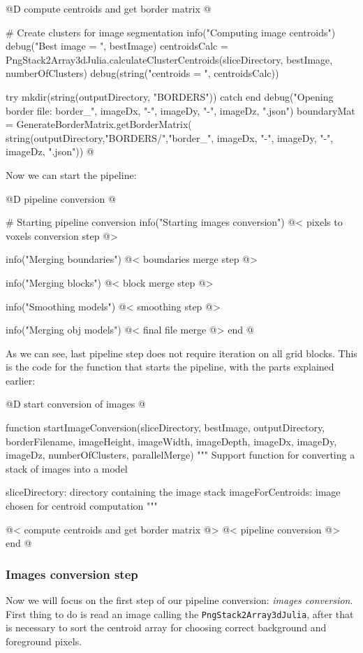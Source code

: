 \documentclass[11pt,oneside]{article}	%
\begin{document}
@D compute centroids and get border matrix
@{# Create clusters for image segmentation
info("Computing image centroids")
debug("Best image = ", bestImage)
centroidsCalc = PngStack2Array3dJulia.calculateClusterCentroids(sliceDirectory,
					bestImage, numberOfClusters)
debug(string("centroids = ", centroidsCalc))

try
  mkdir(string(outputDirectory, "BORDERS"))
catch
end
debug("Opening border file: border_", imageDx, "-", imageDy, "-", imageDz, ".json")
boundaryMat = GenerateBorderMatrix.getBorderMatrix(
					string(outputDirectory,"BORDERS/","border_",
					imageDx, "-", imageDy, "-", imageDz, ".json"))
@}

Now we can start the pipeline:

@D pipeline conversion
@{# Starting pipeline conversion
info("Starting images conversion")
@< pixels to voxels conversion step @>

info("Merging boundaries")
@< boundaries merge step @>
		
info("Merging blocks")
@< block merge step @>

info("Smoothing models")
@< smoothing step @>

info("Merging obj models")
@< final file merge @>
end @}

As we can see, last pipeline step does not require iteration on all grid blocks. This is the code for the function that starts the pipeline, with the parts explained earlier: 

@D start conversion of images
@{function startImageConversion(sliceDirectory, bestImage, outputDirectory, borderFilename,
                              imageHeight, imageWidth, imageDepth,
                              imageDx, imageDy, imageDz,
                              numberOfClusters, parallelMerge)
  """
  Support function for converting a stack of images into a model

  sliceDirectory: directory containing the image stack
  imageForCentroids: image chosen for centroid computation
  """

  @< compute centroids and get border matrix @>
  @< pipeline conversion @>  
end
@}

\subsubsection{Images conversion step}\label{sec:conversionProcess}

Now we will focus on the first step of our pipeline conversion: \textit{images conversion}.\\
First thing to do is read an image calling the \texttt{PngStack2Array3dJulia}, after that is necessary to sort the centroid array for choosing correct background and foreground pixels.
\end{document}
